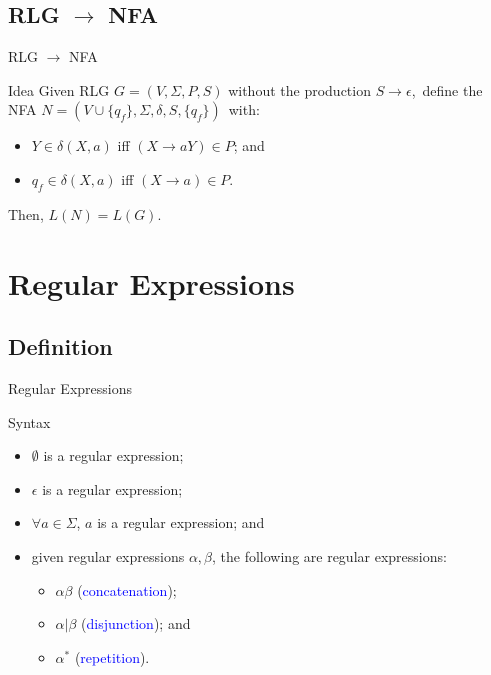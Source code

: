 \documentclass{beamer}
\def\padding{\vspace{0.5cm}}
\def\b{\textcolor{blue}}
\begin{document}
\subsection{RLG $\to$ NFA}

\begin{frame}{RLG $\to$ NFA}
    \begin{block}{Idea}
        Given RLG $G = (V, \Sigma, P, S)$ without the production $S \to \epsilon$\pause,\ define the NFA $N = (V \cup \{q_f\}, \Sigma, \delta, S, \{q_f\})$\pause\ with:
        \begin{itemize}
            \item $Y \in \delta(X, a)$ iff $(X \to aY) \in P$\pause; and
            \item $q_f \in \delta(X, a)$ iff $(X \to a) \in P$.
        \end{itemize}\pause\padding
        Then, $L(N) = L(G)$.
    \end{block}
\end{frame}

\section{Regular Expressions}

\subsection{Definition}

\begin{frame}{Regular Expressions}
    \begin{block}{Syntax}
        \begin{itemize}
            \item $\boldsymbol{\emptyset}$ is a regular expression\pause;
            \item $\epsilon$ is a regular expression\pause;
            \item $\forall a \in \Sigma$, $a$ is a regular expression\pause; and
            \item given regular expressions $\alpha, \beta$, the following are regular expressions:\pause
                \begin{itemize}
                    \item $\alpha \beta$ (\b{concatenation})\pause;
                    \item $\alpha | \beta$ (\b{disjunction})\pause; and
                    \item $\alpha^*$ (\b{repetition}).
                \end{itemize}
        \end{itemize}
    \end{block}
\end{frame}
\end{document}
